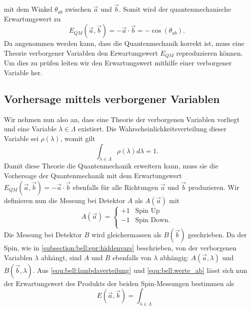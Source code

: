 \begin{refsection}
\begin{equation}
\end{equation}
mit dem Winkel $\theta_{ab}$ zwischen $\vec{a}$ und $\vec{b}$.
Somit wird der quantenmechanische Erwartungswert zu
\begin{equation}\label{equ:bell:res_qm}
    E_{QM}(\vec{a},\vec{b}) = -\vec{a}\cdot\vec{b} = -\cos(\theta_{ab}).
\end{equation}
Da angenommen werden kann, dass die Quantenmechanik korrekt ist, muss eine
Theorie verborgener Variablen den Erwartungswert $E_{QM}$ reproduzieren 
k\"onnen.
Um dies zu pr\"ufen leiten wir den Erwartungswert mithilfe einer verborgener
Variable her.

\subsection{Vorhersage mittels verborgener Variablen}
Wir nehmen nun also an, dass eine Theorie der verborgenen Variablen vorliegt
und eine Variable $\lambda \in \Lambda$ existiert.
Die Wahrscheinlichkeitsverteilung dieser Variable sei $\rho(\lambda)$, womit gilt
\begin{equation}\label{equ:bell:lambdaverteilung}
    \int_{\lambda\in\Lambda} \rho(\lambda) d\lambda = 1.
\end{equation}
Damit diese Theorie die Quantenmechanik erweitern kann, muss sie die Vorhersage
der Quantenmechanik mit dem Erwartungswert 
$E_{QM}(\vec{a},\vec{b}) = -\vec{a}\cdot\vec{b}$
ebenfalls f\"ur alle Richtungen $\vec{a}$ und $\vec{b}$ produzieren.
Wir definieren nun die Messung bei Detektor $A$ als $A(\vec{a})$ mit
\begin{equation}\label{equ:bell:werte_ab}
    A(\vec{a}) = \begin{cases}
        +1 & \text{Spin Up} \\
        -1 & \text{Spin Down.} \\
    \end{cases}
\end{equation}
Die Messung bei Detektor $B$ wird gleichermassen als $B(\vec{b})$ geschrieben.
Da der Spin, wie in \ref{subsection:bell:epr:hiddenvars} beschrieben, von der
verborgenen Variablen $\lambda$ abh\"angt, sind $A$ und $B$ ebenfalls von
$\lambda$ abh\"angig: $A(\vec{a},\lambda)$ und $B(\vec{b},\lambda)$.
Aus \eqref{equ:bell:lambdaverteilung} und \eqref{equ:bell:werte_ab}
l\"asst sich nun der Erwartungswert des Produkts der beiden Spin-Messungen
bestimmen als
\begin{equation}\label{equ:bell:e_lambda}
    E(\vec{a},\vec{b}) = \int_{\lambda\in\Lambda} 

\end{equation}
\end{refsection}
